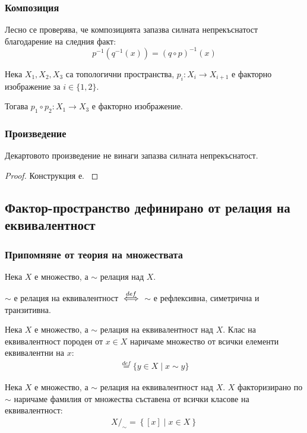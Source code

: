 \subsubsection{Композиция}
Лесно се проверява, че композицията запазва силната непрекъснатост благодарение на следния факт:
\begin{equation}
    p^{-1}(q^{-1}(x)) = (q \circ p)^{-1}(x)
\end{equation}
\begin{proposition}
    Нека $X_1, X_2, X_3$ са топологични пространства, $p_i: X_i \to X_{i+1}$ е факторно изображение за $i \in \{1, 2\}$.

    Тогава $p_1 \circ p_2 : X_1 \to X_3$ е факторно изображение.
\end{proposition}

\subsubsection{Произведение}
Декартовото произведение не винаги запазва силната непрекъснатост.
\begin{proof}
    Конструкция е.
    \cite[стр.~143]{munkrestopology}
\end{proof}

\subsection{Фактор-пространство дефинирано от релация на еквивалентност}
\subsubsection{Припомняне от теория на множествата}
\begin{definition}
    Нека $X$ е множество, а $\sim$ релация над $X$.

    $\sim$ е релация на еквивалентност ${\overset{def}{\iff}}$ $\sim$ е рефлексивна, симетрична и транзитивна.
\end{definition}
\begin{definition}
    Нека $X$ е множество, а $\sim$ релация на еквивалентност над $X$. Клас на еквивалентност породен от $x \in X$ наричаме множество от всички елементи еквивалентни на $x$:
    \begin{eqnarray}
        [x] \overset{def}{=} \{y \in X \mid x \sim y \}
    \end{eqnarray}
\end{definition}

\begin{definition}
    Нека $X$ е множество, а $\sim$ релация на еквивалентност над $X$. $X$ факторизирано по $\sim$ наричаме фамилия от множества съставена от всички класове на еквивалентност:
    \begin{eqnarray}
        X/_\sim = \left\{[x] \mid x \in X\right\}
    \end{eqnarray}
\end{definition}


